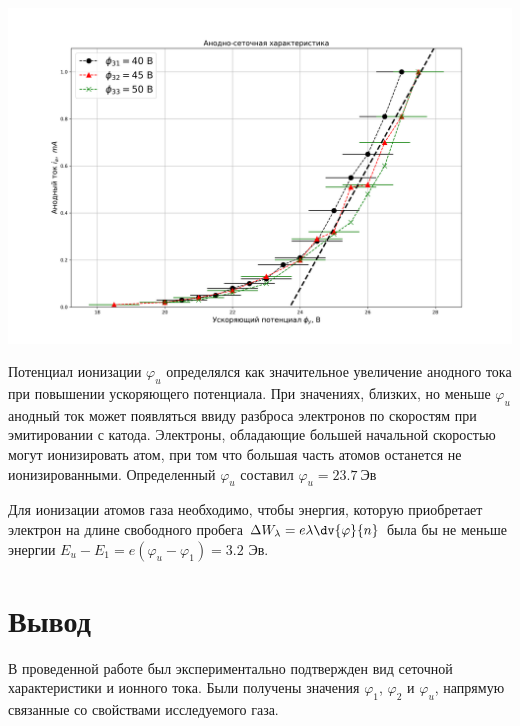 \begin{minipage}{\linewidth}
    \centering
    \includegraphics[width=\linewidth]{graphs/2.png}    
\end{minipage}

Потенциал ионизации $\varphi_u$ определялся как значительное увеличение анодного тока при повышении ускоряющего
потенциала. При значениях, близких, но меньше $\varphi_u$ анодный ток может появляться ввиду разброса электронов по
скоростям при эмитировании с катода. Электроны, обладающие большей начальной скоростью могут ионизировать атом, при том
что большая часть атомов останется не ионизированными. Определенный $\varphi_u$ составил $\varphi_u=23.7\ \text{Эв}$ 

Для ионизации атомов газа необходимо, чтобы энергия, которую приобретает электрон на длине свободного пробега $\Delta W_{\lambda}=e\lambda \displaystyle\dv{\varphi}{n}$
была бы не меньше энергии $E_u-E_1=e(\varphi_u-\varphi_1)=3.2\text{ Эв}.$ 


\section{Вывод}
В проведенной работе был экспериментально подтвержден вид сеточной характеристики и ионного тока. Были получены значения
$\varphi_1$, $\varphi_2$ и $\varphi_u$, напрямую связанные со свойствами исследуемого газа.

